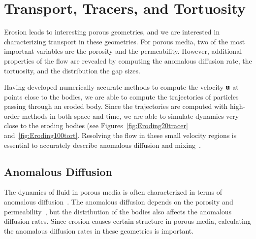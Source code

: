 \documentclass[preprint, 10pt]{elsarticle}
\begin{document}
\section{Transport, Tracers, and Tortuosity}
\label{sec:transport}
Erosion leads to interesting porous geometries, and we are interested in
characterizing transport in these geometries.  For porous media, two of
the most important variables are the porosity and the permeability.
However, additional properties of the flow are revealed by computing
the anomalous diffusion rate, the tortuosity, and the distribution the
gap sizes.

Having developed numerically accurate methods to compute the velocity
${\mathbf{u}}$ at points close to the bodies, we are able to compute the
trajectories of particles passing through an eroded body.  Since the
trajectories are computed with high-order methods in both space and
time,  we are able to simulate dynamics very close to the eroding bodies
(see Figures~\ref{fig:Eroding20tracer} and~\ref{fig:Eroding100tort}.
Resolving the flow in these small velocity regions is essential to
accurately describe anomalous diffusion and
mixing~\cite{leb-den-dav-bol-car-dec-bou2011}.

\subsection{Anomalous Diffusion}
The dynamics of fluid in porous media is often characterized in terms of
anomalous diffusion~\cite{kla-rad-sok2008, den-cor-sch-ber2004}.  The
anomalous diffusion depends on the porosity and
permeability~\cite{koc-bra1988}, but the distribution of the bodies also
affects the anomalous diffusion rates.  Since erosion causes certain
structure in porous media, calculating the anomalous diffusion rates in
these geometries is important.
\end{document}
